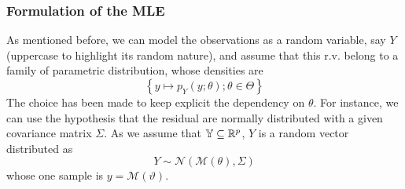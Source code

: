 \documentclass[../../Main_ManuscritThese.tex]{subfiles}
\begin{document}
\subsubsection{Formulation of the MLE}
As mentioned before, we can model the observations as a random variable, say $Y$ (uppercase to highlight its random nature), and assume that this r.v. belong to a family of parametric distribution, whose densities are
\begin{equation}
  \label{eq:family_pdf}
  \left\{y\mapsto p_{Y}(y; \theta) ; \theta\in\Theta \right\}
\end{equation}
The choice has been made to keep explicit the dependency on $\theta$. For instance, we can use the hypothesis that the residual are normally distributed with a given covariance matrix $\Sigma$. As we assume that $\mathbb{Y} \subseteq \mathbb{R}^p$, $Y$ is a random vector distributed as
\begin{equation}
  \label{eq:lik_gaussian}
  Y  \sim \mathcal{N}(\mathcal{M}(\theta), \Sigma)
\end{equation}
whose one sample is $y=\mathscr{M}(\vartheta)$.
\end{document}
